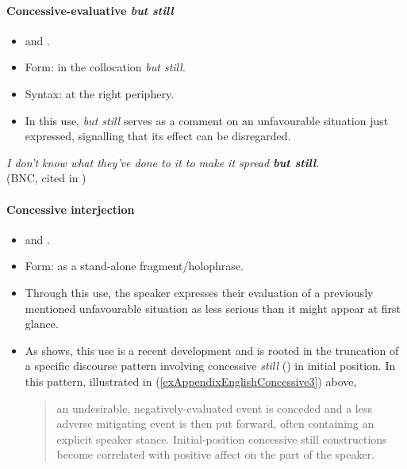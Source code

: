 \paragraph{Concessive-evaluative \textit{but still}}\label{exAppendixEnglishButStill}
\begin{itemize}
	\item \textcite{Lewis2019} and \textcite[215–218]{Ranger2018}.
	\item Form: in the collocation \textit{but still}.
	\item Syntax: at the right periphery.
	\item In this use, \textit{but still} serves as a comment on an unfavourable situation just expressed, signalling that its effect can be disregarded.
\end{itemize}	

\begin{exe}
	\ex \textit{I don't know what they've done to it to make it spread \textbf{but still}.}
	\\(BNC, cited in \cite[129]{Lewis2019})
\end{exe}
	
\paragraph{Concessive interjection}
\label{appendixEnglishConcessiveInterjection}
\begin{itemize}
	\item \textcite{Lewis2019} and \textcite[218–220]{Ranger2018}.
	\item Form: as a stand-alone fragment/holophrase.
	\item Through this use, the speaker expresses their evaluation of a previously mentioned unfavourable situation as less serious than it might appear at first glance.
	\item As \textcite{Lewis2019} shows, this use is a recent development and	is rooted in the truncation of a specific discourse pattern involving concessive \textit{still} () in initial position. In this pattern, illustrated in (\ref{exAppendixEnglishConcessive3}) above,
	\begin{quote}
	an undesirable, negatively-evaluated event is conceded and a less adverse mitigating event is then put forward, often containing an explicit speaker stance. Initial-position concessive still constructions become correlated with positive affect on the part of the speaker. \parencite[138]{Lewis2019}
	\end{quote}	
\end{itemize}

